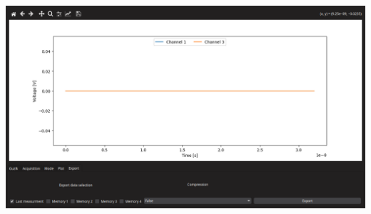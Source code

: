 \documentclass[openright,letterpaper,12pt]{book}
\begin{document}
\begin{center}
		\includegraphics[width=\textwidth]{Figures/Export.png}
\end{center}
\clearpage\null\thispagestyle{empty}
\end{document}
